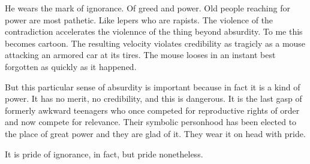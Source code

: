 

He wears the mark of ignorance.  Of greed and power.  Old people
reaching for power are most pathetic.  Like lepers who are rapists.
The violence of the contradiction accelerates the violennce of the
thing beyond absurdity.  To me this becomes cartoon.  The resulting
velocity violates credibility as tragicly as a mouse attacking an
armored car at its tires.  The mouse looses in an instant best
forgotten as quickly as it happened.

But this particular sense of absurdity is important because in fact it
is a kind of power.  It has no merit, no credibility, and this is
dangerous.  It is the last gasp of formerly awkward teenagers who once
competed for reproductive rights of order and now compete for
relevance.  Their symbolic personhood has been elected to the place of
great power and they are glad of it.  They wear it on head with pride.

It is pride of ignorance, in fact, but pride nonetheless.

\bye
